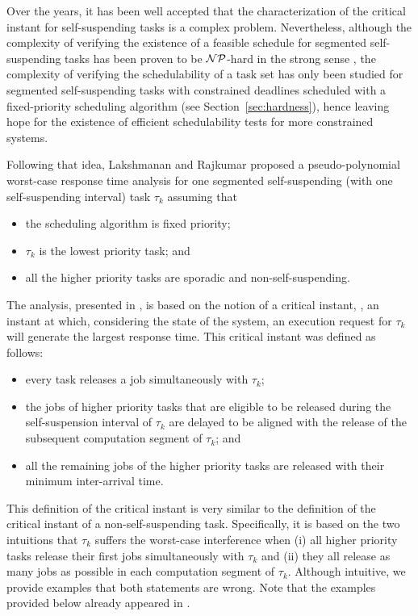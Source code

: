 Over the years, it has been well accepted that the characterization of the critical instant for self-suspending tasks is a complex problem. Nevertheless, although the complexity of verifying the existence of a feasible schedule for segmented self-suspending tasks has been proven to be ${\cal NP}$-hard in the strong sense \cite{Ridouard_2004}, the complexity of verifying the schedulability of a task set has only been studied for segmented self-suspending tasks with constrained deadlines scheduled with a fixed-priority scheduling algorithm (see Section~\ref{sec:hardness}), hence leaving hope for the existence of efficient schedulability tests for more constrained systems. 

Following that idea, Lakshmanan and Rajkumar \cite{LR:rtas10} proposed a pseudo-polynomial worst-case response time analysis for one segmented self-suspending (with one self-suspending interval) task $\tau_k$ assuming that 
\begin{itemize}
\item the scheduling algorithm is fixed priority;
\item $\tau_k$ is the lowest priority task;  and
\item all the higher priority tasks are sporadic and non-self-suspending.
\end{itemize}
The analysis, presented in \cite{LR:rtas10}, is based on the notion of
a critical instant, \ie, an instant at which, considering the state of the system, an execution request for $\tau_k$ will generate the largest response time. This critical instant was defined as follows:
\begin{itemize}
	\item every task releases a job simultaneously with $\tau_k$;
	\item the jobs of higher priority tasks that are eligible to be released during the self-suspension interval of $\tau_k$ are delayed to be aligned with the release of the subsequent computation segment of $\tau_k$; and
	\item all the remaining jobs of the higher priority tasks are released with their minimum inter-arrival time.
\end{itemize}

This definition of the critical instant is very similar to the definition of the critical instant of a non-self-suspending task. Specifically, it is based on the two intuitions that $\tau_k$ suffers the worst-case interference when (i) all higher priority tasks release their first jobs simultaneously with $\tau_k$ and (ii) they all release as many jobs as possible in each computation segment of $\tau_k$. Although intuitive, we provide examples that both statements are wrong. Note that the examples provided below already appeared in \cite{ecrts15nelissen}.

